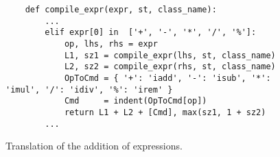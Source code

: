 \begin{figure}[!ht]
\centering
\begin{verbatim}
    def compile_expr(expr, st, class_name):
        ...
        elif expr[0] in  ['+', '-', '*', '/', '%']:
            op, lhs, rhs = expr
            L1, sz1 = compile_expr(lhs, st, class_name)
            L2, sz2 = compile_expr(rhs, st, class_name)
            OpToCmd = { '+': 'iadd', '-': 'isub', '*': 'imul', '/': 'idiv', '%': 'irem' }
            Cmd     = indent(OpToCmd[op])
            return L1 + L2 + [Cmd], max(sz1, 1 + sz2)
        ...
\end{verbatim}
\vspace*{-0.3cm}
\caption{Translation of the addition of expressions.}
\label{fig:Compiler.ipynb:compile:iadd}
\end{figure}


